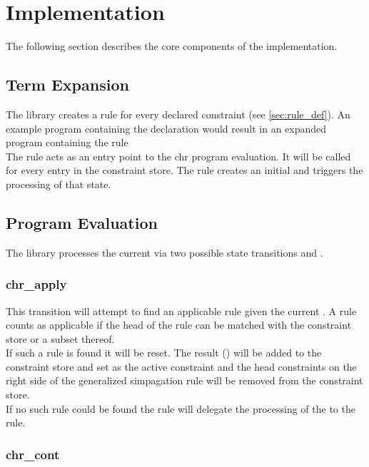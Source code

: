 \section{Implementation}
The following section describes the core components of the {\dhr} implementation.

\subsection{Term Expansion}

The {\dhr} library creates a rule for every declared constraint (see \ref{sec:rule_def}).
An example program containing the declaration  would result in an expanded program containing the rule \\
The  rule acts as an entry point to the chr program evaluation.
It will be called for every entry in the constraint store.
The rule creates an initial  and triggers the processing of that state.

\subsection{Program Evaluation}

The {\dhr} library processes the current  via two possible state transitions  and .

\subsubsection*{chr_apply}

This transition will attempt to find an applicable rule given the current .
A rule counts as applicable if the head of the rule can be matched with the constraint store or a subset thereof.\\
If such a rule is found it will be reset.
The result () will be added to the constraint store and set as the active constraint and the head constraints on the right side of the generalized simpagation rule will be removed from the constraint store.\\
If no such rule could be found the  rule will delegate the processing of the  to the  rule.

\subsubsection*{chr_cont}


